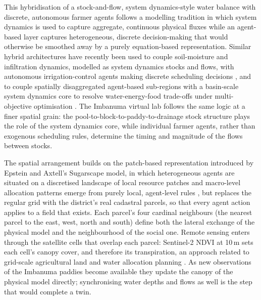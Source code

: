 \documentclass{article}
\begin{document}
This hybridisation of a stock-and-flow, system dynamics-style water balance with discrete, autonomous farmer agents follows a modelling tradition in which system dynamics is used to capture aggregate, continuous physical fluxes while an agent-based layer captures heterogeneous, discrete decision-making that would otherwise be smoothed away by a purely equation-based representation. Similar hybrid architectures have recently been used to couple soil-moisture and infiltration dynamics, modelled as system dynamics stocks and flows, with autonomous irrigation-control agents making discrete scheduling decisions \cite{AhmadiPargo2025HybridIrrigation}, and to couple spatially disaggregated agent-based sub-regions with a basin-scale system dynamics core to resolve water-energy-food trade-offs under multi-objective optimisation \cite{Zarei2025DisaggregatedSDAB}. The Imbanuma virtual lab follows the same logic at a finer spatial grain: the pool-to-block-to-paddy-to-drainage stock structure plays the role of the system dynamics core, while individual farmer agents, rather than exogenous scheduling rules, determine the timing and magnitude of the flows between stocks.

\begin{changed}
The spatial arrangement builds on the patch-based representation introduced by Epstein and Axtell's Sugarscape model, in which heterogeneous agents are situated on a discretised landscape of local resource patches and macro-level allocation patterns emerge from purely local, agent-level rules \cite{EpsteinAxtell1996Sugarscape}, but replaces the regular grid with the district's real cadastral parcels, so that every agent action applies to a field that exists. Each parcel's four cardinal neighbours (the nearest parcel to the east, west, north and south) define both the lateral exchange of the physical model and the neighbourhood of the social one. Remote sensing enters through the satellite cells that overlap each parcel: Sentinel-2 NDVI at 10\,m sets each cell's canopy cover, and therefore its transpiration, an approach related to grid-scale agricultural land and water allocation planning \cite{Tang2020GridScaleRS}. As new observations of the Imbanuma paddies become available they update the canopy of the physical model directly; synchronising water depths and flows as well is the step that would complete a twin.
\end{changed}
\end{document}
